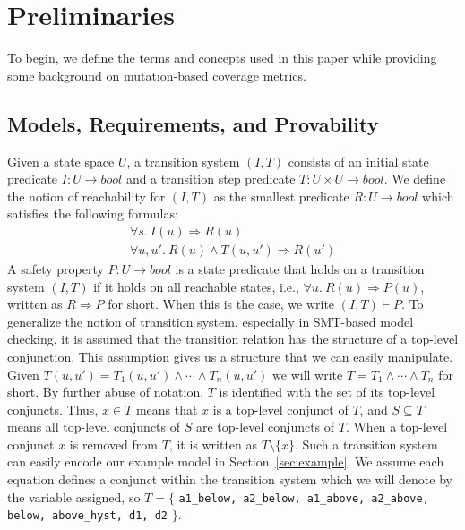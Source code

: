 \section{Preliminaries}
\label{sec:background}
\newcommand{\satisfies}{\vdash_{\!\!s}}
\newcommand{\nsatisfies}{\nvdash_{\!\!s}}
\newcommand{\bool}[0]{\mathit{bool}}
\newcommand{\reach}[0]{\mathit{R}}
\newcommand{\ite}[3]{\mathit{if}\ {#1}\ \mathit{then}\ {#2}\ \mathit{else}\ {#3}}
To begin, we define the terms and concepts used in this paper while providing some background on mutation-based coverage metrics.

\subsection{Models, Requirements, and Provability}

Given a state space $U$, a transition system $(I,T)$ consists of an
initial state predicate $I : U \to \bool$ and a transition step
predicate $T : U \times U \to \bool$. We define the notion of
reachability for $(I, T)$ as the smallest predicate $\reach : U \to
\bool$ which satisfies the following formulas:
\begin{gather*}
  \forall s.~ I(u) \Rightarrow \reach(u) \\
  \forall u, u'.~ \reach(u) \land T(u, u') \Rightarrow \reach(u')
\end{gather*}
A safety property $P : U \to \bool$ is a state predicate that holds on a transition system $(I, T)$ if it holds on all
reachable states, i.e., $\forall u.~ \reach(u) \Rightarrow P(u)$,
written as $\reach \Rightarrow P$ for short. When this is the case, we
write $(I, T)\vdash P$. To generalize the notion of transition system, especially in SMT-based model checking, it is assumed that the transition relation has the structure of a top-level conjunction. This assumption gives us a structure that we can easily manipulate. Given $T(u, u') = T_1(u, u') \land \cdots \land T_n(u, u')$ we will write $T = T_1 \land \cdots \land T_n$ for short.
By further abuse of notation,
$T$ is identified with the set of its top-level conjuncts. Thus, $x \in
T$ means that $x$ is a top-level conjunct of $T$, and $S
\subseteq T$ means all top-level conjuncts of $S$ are top-level
conjuncts of $T$. When a top-level conjunct $x$ is removed from $T$, it is written as $T \setminus \{x\}$. Such a transition system can easily encode our example model in Section~\ref{sec:example}.  We assume each equation defines a conjunct within the transition system which we will denote by the variable assigned, so $T = \{$ {\small \texttt{a1\_below, a2\_below, a1\_above, a2\_above, below, above\_hyst, d1, d2}} $\}$. 


